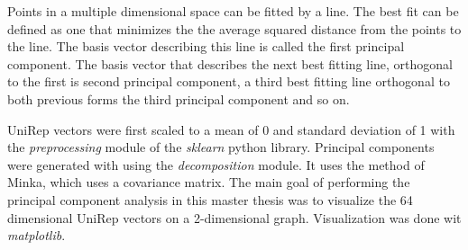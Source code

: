 Points in a multiple dimensional space can be fitted by a line.
The best fit can be defined as one that minimizes the the average squared distance from the points to the line.
The basis vector describing this line is called the first principal component.
The basis vector that describes the next best fitting line, orthogonal to the first is second principal component,
a third best fitting line orthogonal to both previous forms the third principal component and so on.

UniRep vectors were first scaled to a mean of 0 and standard deviation of 1 with the \textit{preprocessing} module of the \textit{sklearn} python library.
Principal components were generated with using the \textit{decomposition} module.
It uses the method of Minka,
which uses a covariance matrix.
The main goal of performing the principal component analysis in this master thesis was to visualize the 64 dimensional UniRep vectors on a 2-dimensional graph.
Visualization was done wit \textit{matplotlib}.
